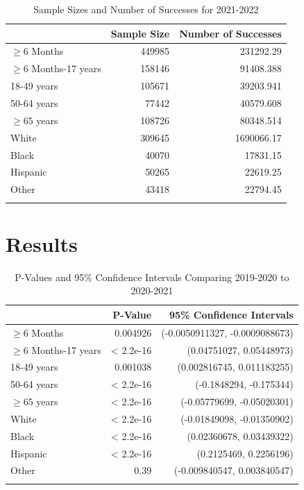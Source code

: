 \documentclass[12pt]{article}
\begin{document}
\begin{table}[ht!]
    \centering
    \caption{Sample Sizes and Number of Successes for 2021-2022}
    \label{tab:table:sizes3}
     \begin{tabularx}{.8\textwidth}{X rr}
      \lsptoprule
                &Sample Size & Number of Successes\\
      \midrule
      $\ge 6$ Months & 449985 & 231292.29\\
      $\ge6$ Months-17 years  &   158146  &    91408.388 \\
      18-49 years  &   105671  &    39203.941  \\
      50-64 years &   77442 &    40579.608 \\
      $\ge 65$ years  &   108726  &    80348.514\\
      White & 309645 & 1690066.17 \\
      Black & 40070 & 17831.15 \\
      Hispanic & 50265 & 22619.25 \\
      Other & 43418 & 22794.45 \\
      \lspbottomrule
     \end{tabularx}
    \end{table}
\clearpage
\section{Results}
\label{sec:Results}
\begin{table}[ht!]
  \centering
  \caption{P-Values and 95\% Confidence Intervals Comparing 2019-2020 to 2020-2021}
  \label{tab:table:results}
   \begin{tabularx}{.8\textwidth}{X rr}
    \lsptoprule
              &P-Value & 95\% Confidence Intervals\\
    \midrule
    $\ge 6$ Months & 0.004926 &  (-0.0050911327, -0.0009088673)\\
    $\ge6$ Months-17 years  &   < 2.2e-16  &    (0.04751027, 0.05448973) \\
    18-49 years  &   0.001038  &    (0.002816745, 0.011183255)  \\
    50-64 years &   < 2.2e-16 &    (-0.1848294, -0.175344) \\
    $\ge 65$ years  &   < 2.2e-16  &  (-0.05779699, -0.05020301) \\
    White & < 2.2e-16 & (-0.01849098, -0.01350902) \\
    Black & < 2.2e-16 & (0.02360678, 0.03439322) \\
    Hispanic & < 2.2e-16 & (0.2125469, 0.2256196) \\
    Other & 0.39 & (-0.009840547, 0.003840547) \\
    \lspbottomrule
   \end{tabularx}
  \end{table}
\end{document}
